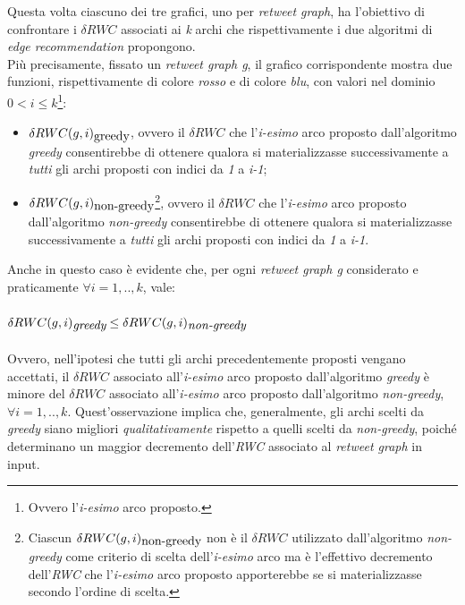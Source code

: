 


Questa volta ciascuno dei tre grafici, uno per \textit{retweet graph}, ha l'obiettivo di confrontare i \textit{$\delta RWC$} associati ai \textit{k} archi che rispettivamente i due algoritmi di \textit{edge recommendation} propongono.
\\Più precisamente, fissato un \textit{retweet graph g}, il grafico corrispondente mostra due funzioni, rispettivamente di colore \textit{rosso} e di colore \textit{blu}, con valori nel dominio \textit{$0 < i \leq k$}\footnote{Ovvero l'\textit{i-esimo} arco proposto.}:
\begin{itemize}
\item \textit{$\delta RWC(g,i)\textsubscript{greedy}$}, ovvero il \textit{$\delta RWC$} che l'\textit{i-esimo} arco proposto dall'algoritmo \textit{greedy} consentirebbe di ottenere qualora si materializzasse successivamente a \textit{tutti} gli archi proposti con indici da \textit{1} a \textit{i-1};
\item \textit{$\delta RWC(g,i)\textsubscript{non-greedy}$}\footnote{Ciascun \textit{$\delta RWC(g,i)\textsubscript{non-greedy}$} non è il \textit{$\delta RWC$} utilizzato dall'algoritmo \textit{non-greedy} come criterio di scelta dell'\textit{i-esimo} arco ma è l'effettivo decremento dell'\textit{RWC} che l'\textit{i-esimo} arco proposto apporterebbe se si materializzasse secondo l'ordine di scelta.}, ovvero il \textit{$\delta RWC$} che l'\textit{i-esimo} arco proposto dall'algoritmo \textit{non-greedy} consentirebbe di ottenere qualora si materializzasse successivamente a \textit{tutti} gli archi proposti con indici da \textit{1} a \textit{i-1}.
\end{itemize}
Anche in questo caso è evidente che, per ogni \textit{retweet graph g} considerato e praticamente $\forall i = 1,..,k$, vale:
\\\\
$\textit{$\delta RWC(g,i)\textsubscript{greedy}$} \leq \textit{$\delta RWC(g,i)\textsubscript{non-greedy}$}$
\\\\
Ovvero, nell'ipotesi che tutti gli archi precedentemente proposti vengano accettati, il \textit{$\delta RWC$} associato all'\textit{i-esimo} arco proposto dall'algoritmo \textit{greedy} è minore del \textit{$\delta RWC$} associato all'\textit{i-esimo} arco proposto dall'algoritmo \textit{non-greedy}, $\forall i = 1,..,k$. Quest'osservazione implica che, generalmente, gli archi scelti da \textit{greedy} siano migliori \textit{qualitativamente} rispetto a quelli scelti da \textit{non-greedy}, poiché determinano un maggior decremento dell'\textit{RWC} associato al \textit{retweet graph} in input.
